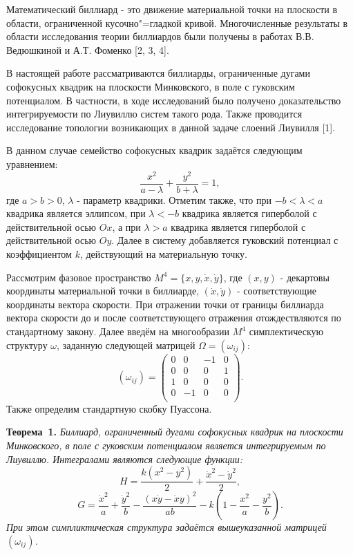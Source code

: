 \vzmscaption

Математический биллиард - это движение материальной точки на плоскости в области, ограниченной кусочно"=гладкой кривой. Многочисленные результаты в области исследования теории биллиардов были получены в работах В.В. Ведюшкиной и А.Т. Фоменко [2, 3, 4].

В настоящей работе рассматриваются биллиарды, ограниченные дугами софокусных квадрик на плоскости Минковского, в поле с гуковским потенциалом. В частности, в ходе исследований было получено доказательство интегрируемости по Лиувиллю систем такого рода. Также проводится исследование топологии возникающих в данной задаче слоений Лиувилля [1].

В данном случае семейство софокусных квадрик задаётся следующим уравнением:
$$\frac{x^2}{a-\lambda}+\frac{y^2}{b+\lambda}=1,$$
где $a>b>0$, $\lambda$ - параметр квадрики. Отметим также, что при $-b<\lambda<a$ квадрика является эллипсом, при $\lambda<-b$ квадрика является гиперболой с действительной осью $Ox$, а при $\lambda>a$ квадрика является гиперболой с действительной осью $Oy$. Далее в систему добавляется гуковский потенциал с коэффициентом $k$, действующий на материальную точку.

Рассмотрим фазовое пространство $M^4=\{x, y, \dot{x}, \dot{y}\}$, где $(x, y)$ - декартовы координаты материальной точки в биллиарде, $(\dot{x}, \dot{y})$ - соответствующие координаты вектора скорости. При отражении точки от границы биллиарда вектора скорости до и после соответствующего отражения отождествляются по стандартному закону. Далее введём на многообразии $M^4$ симплектическую структуру $\omega$, заданную следующей матрицей $\Omega=(\omega_{ij})$:
$$(\omega_{ij})=\left(\begin{array}{cccc}
0 & 0 & -1 & 0 \\
0 & 0 & 0 & 1 \\
1 & 0 & 0 & 0 \\
0 & -1 & 0 & 0 \\
\end{array}\right)
.$$
Также определим стандартную скобку Пуассона.

\textbf{Теорема~1.} {\it Биллиард, ограниченный дугами софокусных квадрик на плоскости Минковского, в поле с гуковским потенциалом является интегрируемым по Лиувиллю. Интегралами являются следующие функции:
$$H=\frac{k(x^2-y^2)}{2}+\frac{{\dot{x}}^2-{\dot{y}}^2}{2},$$
$$G=\frac{{\dot{x}}^2}{a}+\frac{{\dot{y}}^2}{b}-\frac{{(x\dot{y}-\dot{x}y)}^2}{ab}-k(1-\frac{x^2}{a}-\frac{y^2}{b}).$$ При этом симпликтическая структура задаётся вышеуказанной матрицей $(\omega_{ij})$.}


